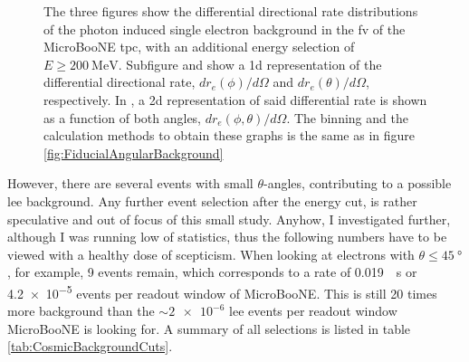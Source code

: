 \begin{figure}[htbp]
    \caption[Differential Directional Rate Distributions of the Photon Induced Electron Background in Fiducial Volume]{The three figures show the differential directional rate distributions of the photon induced single electron background in the \gls{fv} of the MicroBooNE \gls{tpc}, with an additional energy selection of $E \geq \SI{200}{\mega\electronvolt}$. Subfigure  and  show a \gls{1d} representation of the differential directional rate, $dr_e(\phi)/d\Omega$ and $dr_e(\theta)/d\Omega$, respectively. In , a \gls{2d} representation of said differential rate is shown as a function of both angles, \ie $dr_e(\phi,\theta)/d\Omega$. The binning and the calculation methods to obtain these graphs is the same as in figure \ref{fig:FiducialAngularBackground}}
    \label{fig:ECutAngularBackground}
\end{figure}
However, there are several events with small $\theta$-angles, contributing to a possible \gls{lee} background. Any further event selection after the energy cut, is rather speculative and out of focus of this small study. Anyhow, I investigated further, although I was running low of statistics, thus the following numbers have to be viewed with a healthy dose of scepticism. When looking at electrons with $\theta \leq \SI{45}{\degree}$, for example, \num{9} events remain, which corresponds to a rate of \SI{0.019}{\per\second} or \num{4.2e-5} events per readout window of MicroBooNE. This is still \num{20} times more background than the $\sim\num{2e-6}$ \gls{lee} events per readout window MicroBooNE is looking for. A summary of all selections is listed in table \ref{tab:CosmicBackgroundCuts}.
